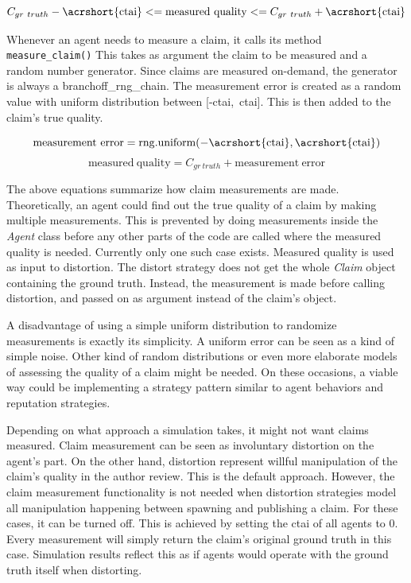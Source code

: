 \documentclass[%
    ]{\PathToTumTemplate/thesis/tum_thesis}
\begin{document}
\begin{equation}\label{eq:ctai}
C_{gr~truth} - \mathrm{\acrshort{ctai}} <= \mathrm{measured~quality} <= C_{gr~truth} + \mathrm{\acrshort{ctai}}
\end{equation}

Whenever an agent needs to measure a claim, it calls its method \lstinline{measure_claim()}
This takes as argument the claim to be measured and a random number generator.
Since claims are measured on-demand, the generator is always a \gls{branchoff_rng_chain}.
The measurement error is created as a random value with uniform distribution between [-\acrshort{ctai},~\acrshort{ctai}].
This is then added to the claim's true quality.

\begin{equation}\label{eq:measure_claim1}
\mathrm{measurement~error = rng.uniform(-\acrshort{ctai}, \acrshort{ctai})}
\end{equation}
\begin{equation}\label{eq:measure_claim2}
\mathrm{measured~quality} = C_{gr~truth} + \mathrm{measurement~error}
\end{equation}

The above equations summarize how claim measurements are made.
Theoretically, an agent could find out the true quality of a claim by making multiple measurements.
This is prevented by doing measurements inside the \emph{Agent} class before any other parts of the code are called where the measured quality is needed.
Currently only one such case exists.
Measured quality is used as input to distortion.
The distort strategy does not get the whole \emph{Claim} object containing the ground truth.
Instead, the measurement is made before calling distortion, and passed on as argument instead of the claim's object.

A disadvantage of using a simple uniform distribution to randomize measurements is exactly its simplicity.
A uniform error can be seen as a kind of simple noise.
Other kind of random distributions or even more elaborate models of assessing the quality of a claim might be needed.
On these occasions, a viable way could be implementing a strategy pattern similar to agent behaviors and reputation strategies.

Depending on what approach a simulation takes, it might not want claims measured.
Claim measurement can be seen as involuntary distortion on the agent's part.
On the other hand, distortion represent willful manipulation of the claim's quality in the author review.
This is the default approach.
However, the claim measurement functionality is not needed when distortion strategies model all manipulation happening between spawning and publishing a claim.
For these cases, it can be turned off.
This is achieved by setting the \gls{ctai} of all agents to 0.
Every measurement will simply return the claim's original ground truth in this case.
Simulation results reflect this as if agents would operate with the ground truth itself when distorting.
\end{document}
